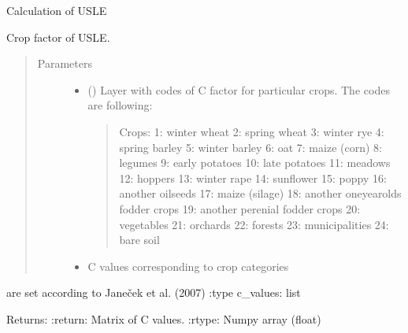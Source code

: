\documentclass[letterpaper,10pt,english]{sphinxmanual}
\begin{document}
\begin{fulllineitems}
\label{\detokenize{libs:usle.RadUSLE}}
Calculation of USLE

\begin{fulllineitems}
\label{\detokenize{libs:usle.RadUSLE.fC}}
Crop factor of USLE.
\begin{quote}\begin{description}
\item[{Parameters}] \leavevmode\begin{itemize}
\item {} 
 (\sphinxstyleliteralemphasis{\sphinxupquote{ (}}\sphinxstyleliteralemphasis{\sphinxupquote{)}}) \textendash{} 
Layer with codes of C factor for particular crops.
The codes are following:
\begin{quote}

Crops:
1: winter wheat
2: spring wheat
3: winter rye
4: spring barley
5: winter barley
6: oat
7: maize (corn)
8: legumes
9: early potatoes
10: late potatoes
11: meadows
12: hoppers
13: winter rape
14:     sunflower
15: poppy
16: another oilseeds
17:     maize (silage)
18: another one\sphinxhyphen{}year\sphinxhyphen{}olds fodder crops
19: another perenial fodder crops
20:     vegetables
21: orchards
22: forests
23: municipalities
24: bare soil
\end{quote}


\item {} 
 \textendash{} C values corresponding to crop categories

\end{itemize}

\end{description}\end{quote}

are set according to Janeček et al. (2007)
:type c\_values: list

Returns:
:return: Matrix of C values.
:rtype: Numpy array (float)

\end{fulllineitems}


\end{fulllineitems}
\end{document}

